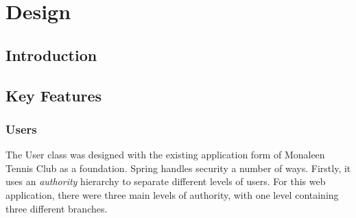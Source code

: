 \chapter{Design}
\label{design}

\section{Introduction}

\section{Key Features}

\subsection{Users}

The User class was designed with the existing application form of Monaleen Tennis Club as a foundation. 
Spring handles security a number of ways. Firstly, it uses an \textit{authority} hierarchy to separate different levels of users. For this web application, there were three main levels of authority, with one level containing three different branches.
